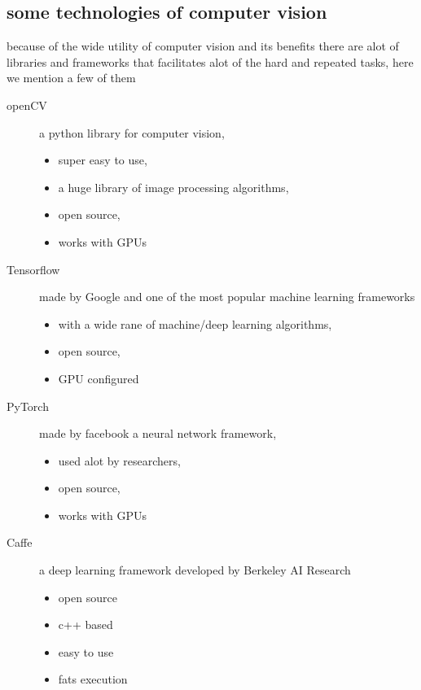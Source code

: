     \subsection{some technologies of computer vision}
        because of the wide utility of computer vision and its benefits there are alot of libraries and frameworks that facilitates alot of the hard and repeated tasks, here we mention a few of them  ~\cite{mldlcv}
        \begin{description}
        \item[openCV] 
            a python library for computer vision,
            \begin{itemize}
                \item super easy to use, 
                \item a huge library of image processing algorithms, 
                \item open source, 
                \item works with GPUs
            \end{itemize}
        \item[Tensorflow]
            made by Google and one of the most popular machine learning frameworks 
            \begin{itemize}
                \item with a wide rane of machine/deep learning algorithms, 
                \item open source, 
                \item GPU configured
            \end{itemize}  
        \item[PyTorch]
            made by facebook a neural network framework, 
            \begin{itemize}
                \item used alot by researchers, 
                \item open source, 
                \item works with GPUs
            \end{itemize}
        \item[Caffe]
            a deep learning framework developed by Berkeley AI Research
            \begin{itemize}
                \item open source
                \item c++ based 
                \item easy to use
                \item fats execution 
            \end{itemize}
        \end{description}
